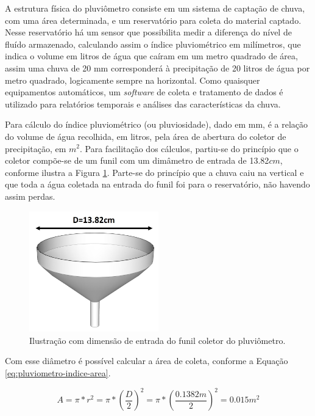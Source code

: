 \documentclass[a4paper]{instrumentacao}
\begin{document}
A estrutura física do pluviômetro consiste em um sistema de captação de chuva, com uma área determinada, e um reservatório para coleta do material captado. Nesse reservatório há um sensor que possibilita medir a diferença do nível de fluído armazenado, calculando assim o índice pluviométrico em milímetros, que indica o volume em litros de água que caíram em um metro quadrado de área, assim uma chuva de 20 mm corresponderá à precipitação de 20 litros de água por metro quadrado, logicamente sempre na horizontal. Como quaisquer equipamentos automáticos, um \textit{software} de coleta e tratamento de dados é utilizado para relatórios temporais e análises das características da chuva.

Para cálculo do índice pluviométrico (ou pluviosidade), dado em mm, é a relação do volume de água recolhida, em litros, pela área de abertura do coletor de precipitação, em $m^2$. Para facilitação dos cálculos, partiu-se do princípio que o coletor compõe-se de um funil com um dimâmetro de entrada de 13.82$cm$, conforme ilustra a Figura \ref{fig:pluviometro-funil}. Parte-se do princípio que a chuva caiu na vertical e que toda a água coletada na entrada do funil foi para o reservatório, não havendo assim perdas.

\begin{figure}[H]
	\centering \includegraphics[width=0.5\textwidth]{pluviometro_funil.jpg}
	\caption{Ilustração com dimensão de entrada do funil coletor do pluviômetro.}
	\label{fig:pluviometro-funil}
\end{figure}

Com esse diâmetro é possível calcular a área de coleta, conforme a Equação \ref{eq:pluviometro-indice-area}.

\begin{equation}
	A=\pi*r^2=\pi*\left ( \frac{D}{2} \right )^2=\pi*\left ( \frac{0.1382m}{2} \right )^2=0.015m^2
	\label{eq:pluviometro-indice-area}
\end{equation}
\end{document}
